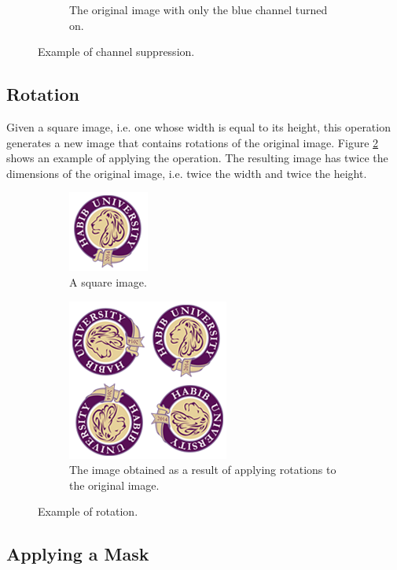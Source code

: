 \documentclass[addpoints]{exam}
\begin{document}
\begin{figure}
\begin{subfigure}{.3\textwidth}
    \caption{The original image with only the blue channel turned on.}
  \end{subfigure}
  \caption{Example of channel suppression.}
  \label{fig:channel}
\end{figure}

\subsection{Rotation}
Given a square image, i.e. one whose width is equal to its height, this operation generates a new image that contains rotations of the original image. Figure \ref{fig:rotate} shows an example of applying the operation. The resulting image has twice the dimensions of the original image, i.e. twice the width and twice the height.

\begin{figure}
  \centering
  \begin{subfigure}{.2\textwidth}
    \includegraphics[scale=.5]{hu-logo}
    \caption{A square image.}
  \end{subfigure}
  \begin{subfigure}[c]{.35\textwidth}
    \includegraphics[scale=.5]{hu-logo-rotated}
    \caption{The image obtained as a result of applying rotations to the original image.}
  \end{subfigure}
  \caption{Example of rotation.}
  \label{fig:rotate}
\end{figure}

\subsection{Applying a Mask}
\end{document}
